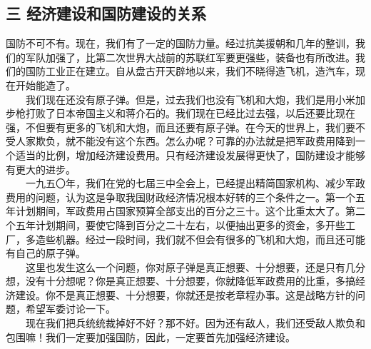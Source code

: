 \documentclass[cn,11pt,chinese]{elegantbook}
\def\myformat#1{\hfil\hfil #1}
\begin{document}
\subsection*{\myformat{三 经济建设和国防建设的关系}}
国防不可不有。现在，我们有了一定的国防力量。经过抗美援朝和几年的整训，我们的军队加强了，比第二次世界大战前的苏联红军要更强些，装备也有所改进。我们的国防工业正在建立。自从盘古开天辟地以来，我们不晓得造飞机，造汽车，现在开始能造了。\\
　　我们现在还没有原子弹。但是，过去我们也没有飞机和大炮，我们是用小米加步枪打败了日本帝国主义和蒋介石的。我们现在已经比过去强，以后还要比现在强，不但要有更多的飞机和大炮，而且还要有原子弹。在今天的世界上，我们要不受人家欺负，就不能没有这个东西。怎么办呢？可靠的办法就是把军政费用降到一个适当的比例，增加经济建设费用。只有经济建设发展得更快了，国防建设才能够有更大的进步。\\
　　一九五〇年，我们在党的七届三中全会上，已经提出精简国家机构、减少军政费用的问题，认为这是争取我国财政经济情况根本好转的三个条件之一。第一个五年计划期间，军政费用占国家预算全部支出的百分之三十。这个比重太大了。第二个五年计划期间，要使它降到百分之二十左右，以便抽出更多的资金，多开些工厂，多造些机器。经过一段时间，我们就不但会有很多的飞机和大炮，而且还可能有自己的原子弹。\\
　　这里也发生这么一个问题，你对原子弹是真正想要、十分想要，还是只有几分想，没有十分想呢？你是真正想要、十分想要，你就降低军政费用的比重，多搞经济建设。你不是真正想要、十分想要，你就还是按老章程办事。这是战略方针的问题，希望军委讨论一下。\\
　　现在我们把兵统统裁掉好不好？那不好。因为还有敌人，我们还受敌人欺负和包围嘛！我们一定要加强国防，因此，一定要首先加强经济建设。\\
\end{document}
